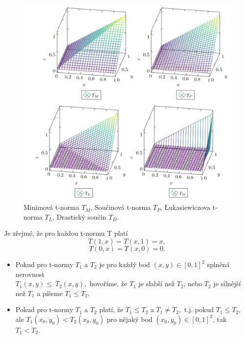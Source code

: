    \begin{figure}[H]
   \caption{ Minimová t-norma $T_M$, Součinová t-norma $T_P$, Łukasiewiczova t-norma $T_L$, Drastický součin $T_D$.}
    \hspace{-1cm}
        \includegraphics[scale=0.6]{template-fig/t_normy.pdf}
        \centering
    \end{figure}


\begin{remark}
    Je zřejmé, že pro každou t-normu T platí
    $$T(1,x)=T(x,1)=x,$$
    $$T(0,x)=T(x,0)=0.$$
\end{remark}
\begin{definition}
\cite{KMP}
    \begin{itemize}
        \item Pokud pro t-normy $T_1$ a $T_2$ je
        pro každý bod $(x,y) \in [0,1]^2$ splněná nerovnost\\
        $T_1(x,y)\leq ~T_2(x,y),$ hovo\v ríme, že $T_1$ je slabší než $T_2$,
        nebo $T_2$ je silnější než $T_1$ a píšeme $T_1\leq T_2$.
        \item  Pokud pro t-normy $T_1$ a $T_2$ platí, že $T_1 \leq T_2$ a
        $T_1 \ne T_2,$ t.j. pokud $T_1 \leq T_2$, ale $T_1(x_0,y_0) <
        T_2(x_0,y_0)$ pro nějaký bod $(x_0,y_0) \in [0,1]^2$, tak $T_1<T_2$.
    \end{itemize}
\end{definition}


